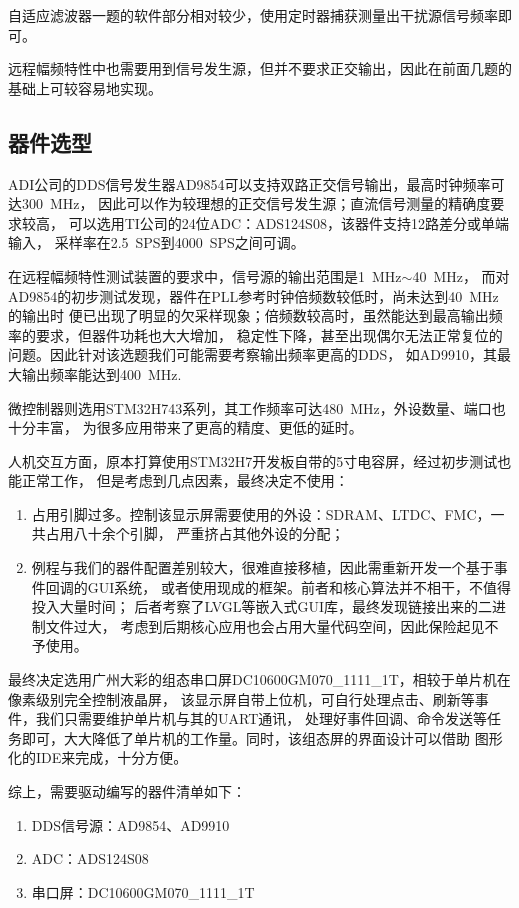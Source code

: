 自适应滤波器一题的软件部分相对较少，使用定时器捕获测量出干扰源信号频率即可。

远程幅频特性中也需要用到信号发生源，但并不要求正交输出，因此在前面几题的基础上可较容易地实现。

\subsection{器件选型}
ADI公司的DDS信号发生器AD9854可以支持双路正交信号输出，最高时钟频率可达\SI{300}{MHz}，
因此可以作为较理想的正交信号发生源；直流信号测量的精确度要求较高，
可以选用TI公司的24位ADC：ADS124S08，该器件支持12路差分或单端输入，
采样率在\SI{2.5}{SPS}到\SI{4000}{SPS}之间可调。

在远程幅频特性测试装置的要求中，信号源的输出范围是\SI{1}{MHz}$\sim$\SI{40}{MHz}，
而对AD9854的初步测试发现，器件在PLL参考时钟倍频数较低时，尚未达到\SI{40}{MHz}的输出时
便已出现了明显的欠采样现象；倍频数较高时，虽然能达到最高输出频率的要求，但器件功耗也大大增加，
稳定性下降，甚至出现偶尔无法正常复位的问题。因此针对该选题我们可能需要考察输出频率更高的DDS，
如AD9910，其最大输出频率能达到\SI{400}{MHz}.

微控制器则选用STM32H743系列，其工作频率可达\SI{480}{MHz}，外设数量、端口也十分丰富，
为很多应用带来了更高的精度、更低的延时。

人机交互方面，原本打算使用STM32H7开发板自带的5寸电容屏，经过初步测试也能正常工作，
但是考虑到几点因素，最终决定不使用：

\begin{enumerate}
    \item 占用引脚过多。控制该显示屏需要使用的外设：SDRAM、LTDC、FMC，一共占用八十余个引脚，
    严重挤占其他外设的分配；
    \item 例程与我们的器件配置差别较大，很难直接移植，因此需重新开发一个基于事件回调的GUI系统，
    或者使用现成的框架。前者和核心算法并不相干，不值得投入大量时间；
    后者考察了LVGL等嵌入式GUI库，最终发现链接出来的二进制文件过大，
    考虑到后期核心应用也会占用大量代码空间，因此保险起见不予使用。
\end{enumerate}

最终决定选用广州大彩的组态串口屏DC10600GM070\_1111\_1T，相较于单片机在像素级别完全控制液晶屏，
该显示屏自带上位机，可自行处理点击、刷新等事件，我们只需要维护单片机与其的UART通讯，
处理好事件回调、命令发送等任务即可，大大降低了单片机的工作量。同时，该组态屏的界面设计可以借助
图形化的IDE来完成，十分方便。

综上，需要驱动编写的器件清单如下：

\begin{enumerate}
    \item DDS信号源：AD9854、AD9910
    \item ADC：ADS124S08
    \item 串口屏：DC10600GM070\_1111\_1T
\end{enumerate}
